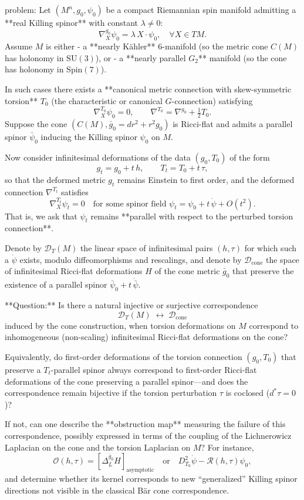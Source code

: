 problem:  
Let \((M^n,g_0,\psi_0)\) be a compact Riemannian spin manifold admitting a **real Killing spinor** with constant \(\lambda \neq 0\):  
\[
\nabla^{g_0}_X \psi_0 = \lambda\, X\!\cdot\!\psi_0,\quad \forall X\in TM.
\]
Assume \(M\) is either  
- a **nearly Kähler** 6-manifold (so the metric cone \(C(M)\) has holonomy in \(\mathrm{SU}(3)\)), or  
- a **nearly parallel \(G_2\)** manifold (so the cone has holonomy in \(\mathrm{Spin}(7)\)).  

In such cases there exists a **canonical metric connection with skew-symmetric torsion** \(T_0\) (the characteristic or canonical \(G\)-connection) satisfying  
\[
\nabla^{T_0}_X \psi_0 = 0, \qquad \nabla^{T_0} = \nabla^{g_0} + \tfrac{1}{2}T_0.
\]
Suppose the cone \((C(M),\bar g_0=dr^2+r^2g_0)\) is Ricci-flat and admits a parallel spinor \(\bar\psi_0\) inducing the Killing spinor \(\psi_0\) on \(M\).

Now consider infinitesimal deformations of the data \((g_0,T_0)\) of the form  
\[
g_t = g_0 + t\,h,\qquad T_t = T_0 + t\,\tau,
\]
so that the deformed metric \(g_t\) remains Einstein to first order, and the deformed connection \(\nabla^{T_t}\) satisfies  
\[
\nabla^{T_t}_X \psi_t = 0 \quad\text{for some spinor field }\psi_t = \psi_0 + t\,\dot\psi + O(t^2).
\]
That is, we ask that \(\psi_t\) remains **parallel with respect to the perturbed torsion connection**.  

Denote by \(\mathcal{D}_T(M)\) the linear space of infinitesimal pairs \((h,\tau)\) for which such a \(\dot\psi\) exists, modulo diffeomorphisms and rescalings, and denote by \(\mathcal{D}_{\text{cone}}\) the space of infinitesimal Ricci-flat deformations \(H\) of the cone metric \(\bar g_0\) that preserve the existence of a parallel spinor \(\bar\psi_0+ t\,\dot{\bar\psi}\).

**Question:**  
Is there a natural injective or surjective correspondence  
\[
\mathcal{D}_T(M) \;\longleftrightarrow\; \mathcal{D}_{\text{cone}}
\]
induced by the cone construction, when torsion deformations on \(M\) correspond to inhomogeneous (non-scaling) infinitesimal Ricci-flat deformations on the cone?  

Equivalently, do first-order deformations of the torsion connection \((g_0,T_0)\) that preserve a \(T_t\)-parallel spinor always correspond to first-order Ricci-flat deformations of the cone preserving a parallel spinor—and does the correspondence remain bijective if the torsion perturbation \(\tau\) is coclosed (\(d^*\tau=0\))?  

If not, can one describe the **obstruction map** measuring the failure of this correspondence, possibly expressed in terms of the coupling of the Lichnerowicz Laplacian on the cone and the torsion Laplacian on \(M\)?  For instance,
\[
\mathcal{O}(h,\tau) = [\Delta_L^{\bar g_0} H]_{\text{asymptotic}} \quad \text{or} \quad D_{T_0}^2\dot\psi - \mathcal{R}(h,\tau)\psi_0,
\]
and determine whether its kernel corresponds to new “generalized” Killing spinor directions not visible in the classical Bär cone correspondence.

